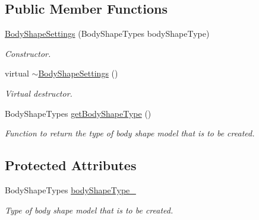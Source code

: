 \subsection*{Public Member Functions}
\begin{DoxyCompactItemize}
\item 
\hyperlink{classtudat_1_1simulation__setup_1_1BodyShapeSettings_af015990acdf8491ce08eaa09942e9ba9}{Body\+Shape\+Settings} (Body\+Shape\+Types body\+Shape\+Type)
\begin{DoxyCompactList}\small\item\em Constructor. \end{DoxyCompactList}\item 
virtual \hyperlink{classtudat_1_1simulation__setup_1_1BodyShapeSettings_a01c1acff52aa5e6ff7ebf38ebceb067d}{$\sim$\+Body\+Shape\+Settings} ()\hypertarget{classtudat_1_1simulation__setup_1_1BodyShapeSettings_a01c1acff52aa5e6ff7ebf38ebceb067d}{}\label{classtudat_1_1simulation__setup_1_1BodyShapeSettings_a01c1acff52aa5e6ff7ebf38ebceb067d}

\begin{DoxyCompactList}\small\item\em Virtual destructor. \end{DoxyCompactList}\item 
Body\+Shape\+Types \hyperlink{classtudat_1_1simulation__setup_1_1BodyShapeSettings_a2be8f01872d2daa61361202c4c63369c}{get\+Body\+Shape\+Type} ()
\begin{DoxyCompactList}\small\item\em Function to return the type of body shape model that is to be created. \end{DoxyCompactList}\end{DoxyCompactItemize}
\subsection*{Protected Attributes}
\begin{DoxyCompactItemize}
\item 
Body\+Shape\+Types \hyperlink{classtudat_1_1simulation__setup_1_1BodyShapeSettings_ae71984c56aa0ccfa926d5da83c799a47}{body\+Shape\+Type\+\_\+}\hypertarget{classtudat_1_1simulation__setup_1_1BodyShapeSettings_ae71984c56aa0ccfa926d5da83c799a47}{}\label{classtudat_1_1simulation__setup_1_1BodyShapeSettings_ae71984c56aa0ccfa926d5da83c799a47}

\begin{DoxyCompactList}\small\item\em Type of body shape model that is to be created. \end{DoxyCompactList}\end{DoxyCompactItemize}


